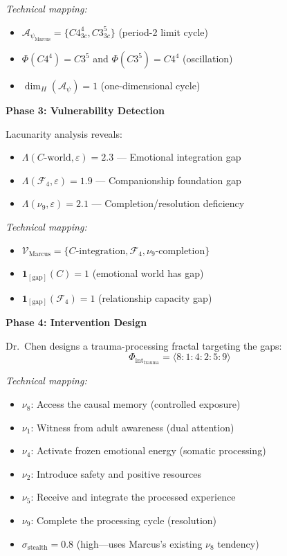 \documentclass[11pt,twoside]{book}
\newcommand{\noe}[1]{\nu_{#1}}
\newcommand{\Foundations}{\mathcal{F}}
\newcommand{\Frac}{\Phi}
\newcommand{\HausdorffDim}{\dim_H}
\newcommand{\Lacunarity}{\Lambda}
\newcommand{\PsychAttractor}{\mathcal{A}_\psi}
\newcommand{\ManipFrac}{\Phi_{\mathrm{int}}}
\newcommand{\VulnSet}{\mathcal{V}}
\newcommand{\StealthFactor}{\sigma_{\mathrm{stealth}}}
\begin{document}
\begin{tcolorbox}[colback=yellow!5!white,colframe=yellow!65!black,title=\textbf{Scenario 1: Therapeutic Application --- Trauma Patient},breakable]
\textit{Technical mapping:}
\begin{itemize}
    \item $\PsychAttractor_{\mathrm{Marcus}} = \{C4^4_{3c}, C3^5_{3c}\}$ (period-2 limit cycle)
    \item $\Frac(C4^4) = C3^5$ and $\Frac(C3^5) = C4^4$ (oscillation)
    \item $\HausdorffDim(\PsychAttractor) = 1$ (one-dimensional cycle)
\end{itemize}

\textbf{Phase 3: Vulnerability Detection}

Lacunarity analysis reveals:
\begin{itemize}
    \item $\Lacunarity(C\text{-world}, \varepsilon) = 2.3$ --- Emotional integration gap
    \item $\Lacunarity(\Foundations_4, \varepsilon) = 1.9$ --- Companionship foundation gap
    \item $\Lacunarity(\noe{9}, \varepsilon) = 2.1$ --- Completion/resolution deficiency
\end{itemize}

\textit{Technical mapping:}
\begin{itemize}
    \item $\VulnSet_{\mathrm{Marcus}} = \{C\text{-integration}, \Foundations_4, \noe{9}\text{-completion}\}$
    \item $\mathbf{1}_{[\mathrm{gap}]}(C) = 1$ (emotional world has gap)
    \item $\mathbf{1}_{[\mathrm{gap}]}(\Foundations_4) = 1$ (relationship capacity gap)
\end{itemize}

\textbf{Phase 4: Intervention Design}

Dr.\ Chen designs a trauma-processing fractal targeting the gaps:
\[
    \ManipFrac_{\mathrm{trauma}} = \langle 8:1:4:2:5:9 \rangle
\]

\textit{Technical mapping:}
\begin{itemize}
    \item $\noe{8}$: Access the causal memory (controlled exposure)
    \item $\noe{1}$: Witness from adult awareness (dual attention)
    \item $\noe{4}$: Activate frozen emotional energy (somatic processing)
    \item $\noe{2}$: Introduce safety and positive resources
    \item $\noe{5}$: Receive and integrate the processed experience
    \item $\noe{9}$: Complete the processing cycle (resolution)
    \item $\StealthFactor = 0.8$ (high---uses Marcus's existing $\noe{8}$ tendency)
\end{itemize}


\end{tcolorbox}
\end{document}
